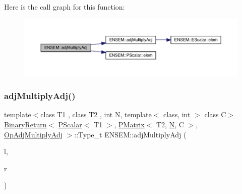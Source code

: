 Here is the call graph for this function\+:\nopagebreak
\begin{figure}[H]
\begin{center}
\leavevmode
\includegraphics[width=350pt]{df/d0a/group__primmatrix_gada4da32758440b83d445ae4a0e14297e_cgraph}
\end{center}
\end{figure}
\mbox{\label{group__primmatrix_ga5b52c2e633a016e706b74e388b8af102}} 
\subsubsection{\texorpdfstring{adjMultiplyAdj()}{adjMultiplyAdj()}\hspace{0.1cm}{\footnotesize\ttfamily [2/3]}}
{\footnotesize\ttfamily template$<$class T1 , class T2 , int N, template$<$ class, int $>$ class C$>$ \\
\mbox{\hyperlink{structENSEM_1_1BinaryReturn}{Binary\+Return}}$<$ \mbox{\hyperlink{classENSEM_1_1PScalar}{P\+Scalar}}$<$ T1 $>$, \mbox{\hyperlink{classENSEM_1_1PMatrix}{P\+Matrix}}$<$ T2, \mbox{\hyperlink{adat__devel_2lib_2hadron_2operator__name__util_8cc_a7722c8ecbb62d99aee7ce68b1752f337}{N}}, C $>$, \mbox{\hyperlink{structENSEM_1_1OpAdjMultiplyAdj}{Op\+Adj\+Multiply\+Adj}} $>$\+::Type\+\_\+t E\+N\+S\+E\+M\+::adj\+Multiply\+Adj (\begin{DoxyParamCaption}\item[{const \mbox{\hyperlink{classENSEM_1_1PScalar}{P\+Scalar}}$<$ T1 $>$ \&}]{l,  }\item[{const \mbox{\hyperlink{classENSEM_1_1PMatrix}{P\+Matrix}}$<$ T2, \mbox{\hyperlink{adat__devel_2lib_2hadron_2operator__name__util_8cc_a7722c8ecbb62d99aee7ce68b1752f337}{N}}, C $>$ \&}]{r }\end{DoxyParamCaption})\hspace{0.3cm}{\ttfamily [inline]}}

